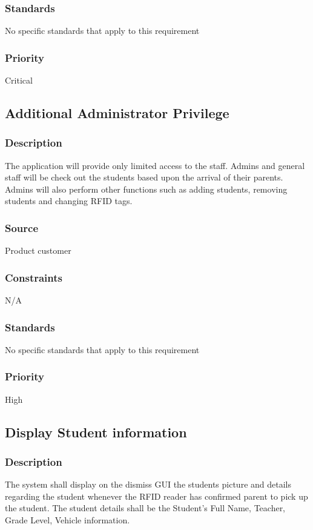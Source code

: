 \subsubsection{Standards}
\quad \quad No specific standards that apply to this requirement
\subsubsection{Priority}
\quad \quad Critical

\subsection{Additional Administrator Privilege}
\subsubsection{Description}
\quad \quad The application will provide only limited access to the staff. Admins and general 
staff will be check out the students based upon the arrival of their parents. Admins 
will also perform other functions such as adding students, removing students and 
changing RFID tags.
\subsubsection{Source}
\quad \quad Product customer
\subsubsection{Constraints}
\quad \quad N/A
\subsubsection{Standards}
\quad \quad No specific standards that apply to this requirement
\subsubsection{Priority}
\quad \quad High

\subsection{Display Student information}
\subsubsection{Description}
\quad \quad The system shall display on the dismiss GUI the students picture and details 
regarding the student whenever the RFID reader has confirmed parent to pick up the 
student. The student details shall be the Student's Full Name, Teacher, Grade Level, 
Vehicle information.
